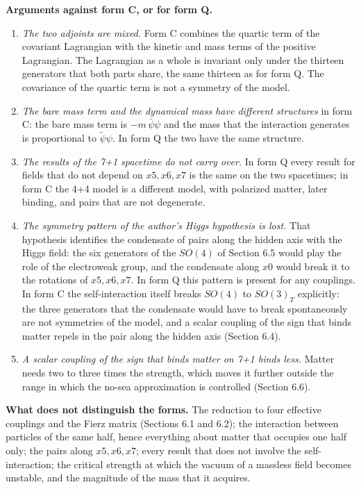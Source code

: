 \documentclass[
  10pt,
]{article}
\providecommand{\tightlist}{%
  \setlength{\itemsep}{0pt}\setlength{\parskip}{0pt}}
\begin{document}
\textbf{Arguments against form C, or for form Q.}

\begin{enumerate}
\def\labelenumi{\arabic{enumi}.}
\tightlist
\item
  \emph{The two adjoints are mixed.} Form C combines the quartic term of
  the covariant Lagrangian with the kinetic and mass terms of the
  positive Lagrangian. The Lagrangian as a whole is invariant only under
  the thirteen generators that both parts share, the same thirteen as
  for form Q. The covariance of the quartic term is not a symmetry of
  the model.
\item
  \emph{The bare mass term and the dynamical mass have different
  structures} in form C: the bare mass term is \(-m\,\bar\psi\psi\) and
  the mass that the interaction generates is proportional to
  \(\tilde\psi\psi\). In form Q the two have the same structure.
\item
  \emph{The results of the 7+1 spacetime do not carry over.} In form Q
  every result for fields that do not depend on \(x5,x6,x7\) is the same
  on the two spacetimes; in form C the 4+4 model is a different model,
  with polarized matter, later binding, and pairs that are not
  degenerate.
\item
  \emph{The symmetry pattern of the author's Higgs hypothesis is lost.}
  That hypothesis identifies the condensate of pairs along the hidden
  axis with the Higgs field: the six generators of the \(SO(4)\) of
  Section 6.5 would play the role of the electroweak group, and the
  condensate along \(x0\) would break it to the rotations of
  \(x5,x6,x7\). In form Q this pattern is present for any couplings. In
  form C the self-interaction itself breaks \(SO(4)\) to \(SO(3)_T\)
  explicitly: the three generators that the condensate would have to
  break spontaneously are not symmetries of the model, and a scalar
  coupling of the sign that binds matter repels in the pair along the
  hidden axis (Section 6.4).
\item
  \emph{A scalar coupling of the sign that binds matter on 7+1 binds
  less.} Matter needs two to three times the strength, which moves it
  further outside the range in which the no-sea approximation is
  controlled (Section 6.6).
\end{enumerate}

\textbf{What does not distinguish the forms.} The reduction to four
effective couplings and the Fierz matrix (Sections 6.1 and 6.2); the
interaction between particles of the same half, hence everything about
matter that occupies one half only; the pairs along \(x5,x6,x7\); every
result that does not involve the self-interaction; the critical strength
at which the vacuum of a massless field becomes unstable, and the
magnitude of the mass that it acquires.
\end{document}
